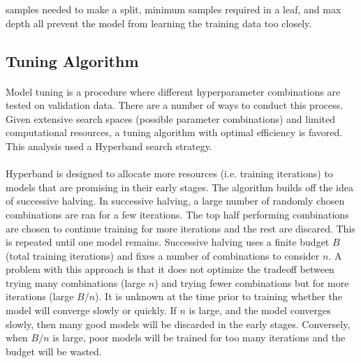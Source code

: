 \documentclass[11pt]{article}
\begin{document}
            \begin{multicols*}{2}

            
            \noindent samples needed to make a split, minimum samples required in a leaf, and max depth all prevent the model from learning the training data too closely.
            
            
        \subsection{Tuning Algorithm}
            \paragraph{}
                Model tuning is a procedure where different hyperparameter combinations are tested on validation data. 
                There are a number of ways to conduct this process.
                Given extensive search spaces (possible parameter combinations) and limited computational resources, a tuning algorithm with optimal efficiency is favored.
                This analysis used a Hyperband search strategy. 
                
            \vspace{-10pt}

            \paragraph{}
                Hyperband is designed to allocate more resources (i.e. training iterations) to models that are promising in their early stages. 
                The algorithm builds off the idea of successive halving.
                In successive halving, a large number of randomly chosen combinations are ran for a few iterations. 
                The top half performing combinations are chosen to continue training for more iterations and the rest are discared.
                This is repeated until one model remains. 
                Successive halving uses a finite budget $B$ (total training iterations) and fixes a number of combinations to consider $n$.
                A problem with this approach is that it does not optimize the tradeoff between trying many combinations (large $n$) and trying fewer combinations but for more iterations (large $B/n$).
                It is unknown at the time prior to training whether the model will converge slowly or quickly.
                If $n$ is large, and the model converges slowly, then many good models will be discarded in the early stages.
                Conversely, when $B/n$ is large, poor models will be trained for too many iterations and the budget will be wasted. 
                

\end{multicols*}
\end{document}
